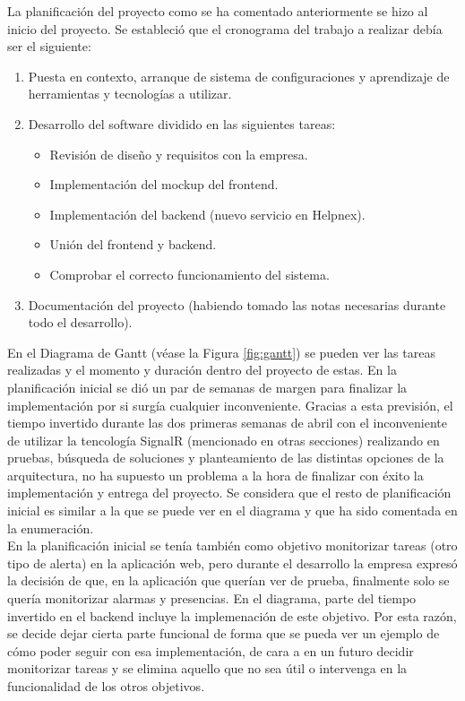 La planificación del proyecto como se ha comentado anteriormente se hizo al inicio del proyecto. Se estableció que el cronograma del trabajo a realizar debía ser el siguiente:
\begin{enumerate}
    \item Puesta en contexto, arranque de sistema de configuraciones y aprendizaje de herramientas y tecnologías a utilizar.
    \item Desarrollo del software dividido en las siguientes tareas:
    \begin{itemize}
        \item Revisión de diseño y requisitos con la empresa.
        \item Implementación del mockup del frontend.
        \item Implementación del backend (nuevo servicio en Helpnex).
        \item Unión del frontend y backend.
        \item Comprobar el correcto funcionamiento del sistema.
    \end{itemize}
    \item Documentación del proyecto (habiendo tomado las notas necesarias durante todo el desarrollo).
\end{enumerate}

En el Diagrama de Gantt (véase la Figura \ref{fig:gantt}) se pueden ver las tareas realizadas y el momento y duración dentro del proyecto de estas. En la planificación inicial se dió un par de semanas de margen para finalizar la implementación por si surgía cualquier inconveniente. Gracias a esta previsión, el tiempo invertido durante las dos primeras semanas de abril con el inconveniente de utilizar la tencología SignalR (mencionado en otras secciones) realizando en pruebas, búsqueda de soluciones y planteamiento de las distintas opciones de la arquitectura, no ha supuesto un problema a la hora de finalizar con éxito la implementación y entrega del proyecto. Se considera que el resto de planificación inicial es similar a la que se puede ver en el diagrama y que ha sido comentada en la enumeración. \\

En la planificación inicial se tenía también como objetivo monitorizar tareas (otro tipo de alerta) en la aplicación web, pero durante el desarrollo la empresa expresó la decisión de que, en la aplicación que querían ver de prueba, finalmente solo se quería monitorizar alarmas y presencias. En el diagrama, parte del tiempo invertido en el backend incluye la implemenación de este objetivo. Por esta razón, se decide dejar cierta parte funcional de forma que se pueda ver un ejemplo de cómo poder seguir con esa implementación, de cara a en un futuro decidir monitorizar tareas y se elimina aquello que no sea útil o intervenga en la funcionalidad de los otros objetivos.\\

